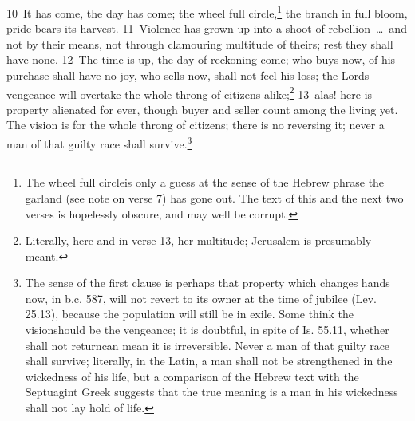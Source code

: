 \documentclass[10pt]{book} %
\begin{document}
\textcolor{benred8}{10}~It has come, the day has come; the wheel full circle,\footnote[3]{\textasciigrave The wheel full circle\textquotesingle  is only a guess at the sense of the Hebrew phrase \textasciigrave the garland (see note on verse 7) has gone out\textquotesingle . The text of this and the next two verses is hopelessly obscure, and may well be corrupt.} the branch in full bloom, pride bears its harvest. \textcolor{benred8}{11}~Violence has grown up into a shoot of rebellion~\ldots\  and not by their means, not through clamouring multitude of theirs; rest they shall have none. \textcolor{benred8}{12}~The time is up, the day of reckoning come; who buys now, of his purchase shall have no joy, who sells now, shall not feel his loss; the Lord\textquotesingle s vengeance will overtake the whole throng of citizens alike;\footnote[4]{Literally, here and in verse 13, \textasciigrave her multitude\textquotesingle ; Jerusalem is presumably meant.} \textcolor{benred8}{13}~alas! here is property alienated for ever, though buyer and seller count among the living yet. The vision is for the whole throng of citizens; there is no reversing it; never a man of that guilty race shall survive.\footnote[5]{The sense of the first clause is perhaps that property which changes hands now, in b.c. 587, will not revert to its owner at the time of jubilee (Lev. 25.13), because the population will still be in exile. Some think \textasciigrave the vision\textquotesingle  should be \textasciigrave the vengeance\textquotesingle ; it is doubtful, in spite of Is. 55.11, whether \textasciigrave shall not return\textquotesingle  can mean \textasciigrave it is irreversible\textquotesingle . \textasciigrave Never a man of that guilty race shall survive\textquotesingle ; literally, in the Latin, \textasciigrave a man shall not be strengthened in the wickedness of his life\textquotesingle , but a comparison of the Hebrew text with the Septuagint Greek suggests that the true meaning is \textasciigrave a man in his wickedness shall not lay hold of life\textquotesingle .}
\end{document}
